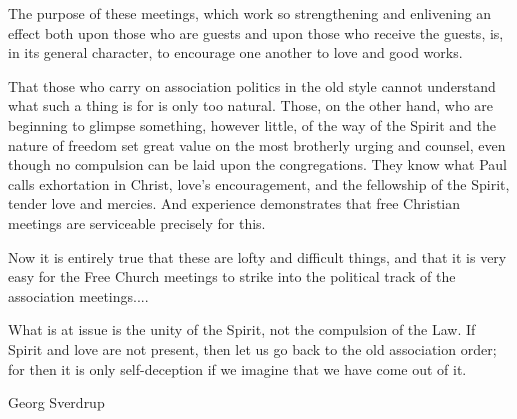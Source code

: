 The purpose of these meetings, which work so strengthening and enlivening an effect both upon those who are guests and upon those who receive the guests, is, in its general character, to encourage one another to love and good works.

That those who carry on association politics in the old style cannot understand what such a thing is for is only too natural. Those, on the other hand, who are beginning to glimpse something, however little, of the way of the Spirit and the nature of freedom set great value on the most brotherly urging and counsel, even though no compulsion can be laid upon the congregations. They know what Paul calls exhortation in Christ, love’s encouragement, and the fellowship of the Spirit, tender love and mercies. And experience demonstrates that free Christian meetings are serviceable precisely for this.

Now it is entirely true that these are lofty and difficult things, and that it is very easy for the Free Church meetings to strike into the political track of the association meetings....

What is at issue is the unity of the Spirit, not the compulsion of the Law. If Spirit and love are not present, then let us go back to the old association order; for then it is only self-deception if we imagine that we have come out of it.

Georg Sverdrup

